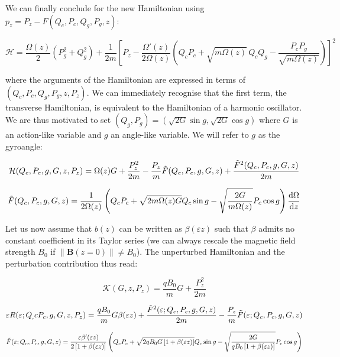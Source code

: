 We can finally conclude for the new Hamiltonian using $p_z=P_z-F(Q_c,P_c,Q_g,P_g,z)$:

\begin{equation*}
    \mathcal{H}=\frac{\Omega(z)}{2}\left(P_g^2+Q_g^2\right)+\frac{1}{2m}\left[P_z-\frac{\Omega'(z)}{2\Omega(z)}\left(Q_cP_c+\sqrt{m\Omega(z)}\,Q_cQ_g-\frac{P_cP_g}{\sqrt{m\Omega(z)}}\right)\right]^2
\end{equation*}

where the arguments of the Hamiltonian are expressed in terms of $(Q_c,P_c,Q_g,P_g,z,P_z)$. We can immediately recognise that the first term, the transverse Hamiltonian, is equivalent to the Hamiltonian of a harmonic oscillator. We are thus motivated to set $(Q_g,P_g)=(\sqrt{2G}\sin{g},\sqrt{2G}\cos{g})$ where $G$ is an action-like variable and $g$ an angle-like variable. We will refer to $g$ as the gyroangle:

\begin{equation}
    \label{H-49}
    \mathcal{H}(Q_c,P_c,g,G,z,P_z)=\Omega(z)G+\frac{P_z^2}{2m}-\frac{P_z}{m}\Tilde{F}(Q_c,P_c,g,G,z)+\frac{\Tilde{F}^2(Q_c,P_c,g,G,z)}{2m}
\end{equation}

\begin{equation*}
    \Tilde{F}(Q_c,P_c,g,G,z)=\frac{1}{2\Omega(z)}\left(Q_cP_c+\sqrt{2m\Omega(z)G}Q_c\sin{g}-\sqrt{\frac{2G}{m\Omega(z)}}P_c\cos{g}\right)\frac{\mathrm{d}\Omega}{\mathrm{d}z}
\end{equation*}

Let us now assume that $b(z)$ can be written as $\beta(\varepsilon z)$ such that $\beta$ admits no constant coefficient in its Taylor series (we can always rescale the magnetic field strength $B_0$ if $\left\|\mathbf{B}(z=0)\right\|\neq B_0$). The unperturbed Hamiltonian and the perturbation contribution thus read:

\begin{equation*}
    \mathcal{K}(G,z,P_z)=\frac{qB_0}{m}G+\frac{P_z^2}{2m}
\end{equation*}

\iffalse

\begin{equation*}
    \varepsilon R(\varepsilon;Q_,cP_c,g,G,z,P_z)=\frac{qB_0}{m}G\beta(\varepsilon z)+\frac{\Tilde{F}^2(\varepsilon; Q_c,P_c,g,G,z)}{2m}-\frac{P_z}{m}\Tilde{F}(\varepsilon; Q_c,P_c,g,G,z)
\end{equation*}

\begin{equation*}
    \Tilde{F}(\varepsilon; Q_c,P_c,g,G,z)=\frac{\varepsilon\beta'(\varepsilon z)}{2\left[1+\beta(\varepsilon z)\right]}\left(Q_cP_c+\sqrt{2qB_0G \left[1+\beta(\varepsilon z)\right]}Q_c\sin{g}-\sqrt{\frac{2G}{qB_0 \left[1+\beta(\varepsilon z)\right]}}P_c\cos{g}\right)
\end{equation*}

